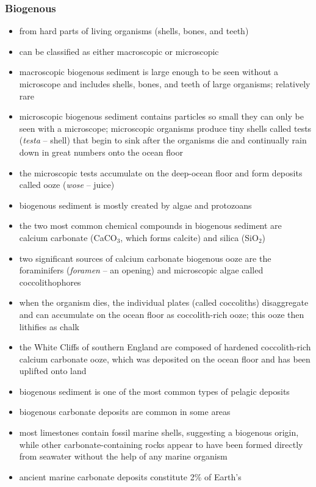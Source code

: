 \subsubsection{Biogenous}
\begin{itemize}
	\item from hard parts of living organisms (shells, bones, and teeth)
	\item can be classified as either macroscopic or microscopic
	\item macroscopic biogenous sediment is large enough to be seen
		without a microscope and includes shells, bones, and teeth of
		large organisms; relatively rare
	\item microscopic biogenous sediment contains particles so small they
		can only be seen with a microscope; microscopic organisms
		produce tiny shells called tests (\textit{testa} -- shell) that
		begin to sink after the organisms die and continually rain down
		in great numbers onto the ocean floor
	\item the microscopic tests accumulate on the deep-ocean floor and form
		deposits called ooze (\textit{wose} -- juice)
	\item biogenous sediment is mostly created by algae and protozoans
	\item the two most common chemical compounds in biogenous sediment are
		calcium carbonate (CaCO$_3$, which forms calcite) and silica
		(SiO$_2$)
	\item two significant sources of calcium carbonate biogenous ooze are
		the foraminifers (\textit{foramen} -- an opening) and
		microscopic algae called coccolithophores
	\item when the organism dies, the individual plates (called coccoliths)
		disaggregate and can accumulate on the ocean floor as
		coccolith-rich ooze; this ooze then lithifies as chalk
	\item the White Cliffs of southern England are composed of hardened
		coccolith-rich calcium carbonate ooze, which was deposited on
		the ocean floor and has been uplifted onto land
	\item biogenous sediment is one of the most common types of pelagic
		deposits
	\item biogenous carbonate deposits are common in some areas
	\item most limestones contain fossil marine shells, suggesting a
		biogenous origin, while other carbonate-containing rocks appear
		to have been formed directly from seawater without the help of
		any marine organism
	\item ancient marine carbonate deposits constitute 2\% of Earth's

\end{itemize}
